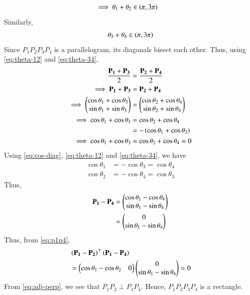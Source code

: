 \documentclass[journal,12pt,twocolumn]{IEEEtran}
\renewcommand{\vec}[1]{\boldsymbol{\mathbf{#1}}}
\begin{document}
\begin{enumerate}
\begin{align}
        \implies \theta_1+\theta_2 &\in \left(\pi,3\pi\right)
        \label{eq:theta-12}
    \end{align}
    Similarly,
    \begin{align}
        \theta_3+\theta_4 \in \left(\pi,3\pi\right)
        \label{eq:theta-34}
    \end{align}
    Since $P_1P_2P_3P_4$ is a parallelogram, its diagonals bisect each other. 
    Thus, using \eqref{eq:theta-12} and \eqref{eq:theta-34},
    \begin{align}
        \frac{\vec{P_1}+\vec{P_3}}{2} &= \frac{\vec{P_2}+\vec{P_4}}{2} \\
        \implies \vec{P_1}+\vec{P_3} &= \vec{P_2}+\vec{P_4} \\
        \implies \myvec{\cos\theta_1+\cos\theta_3\\\sin\theta_1+\sin\theta_3} &= \myvec{\cos\theta_2+\cos\theta_4\\\sin\theta_2+\sin\theta_4} \\
        \implies \cos\theta_1+\cos\theta_3 &= \cos\theta_2+\cos\theta_4 \\
                                           &= -\brak{\cos\theta_1+\cos\theta_3} \\
        \implies \cos\theta_1+\cos\theta_3 &= \cos\theta_2+\cos\theta_4 = 0
        \label{eq:cos-diag}
    \end{align}
    Using \eqref{eq:cos-diag}, \eqref{eq:theta-12} and \eqref{eq:theta-34}, we have
    \begin{align}
        \cos\theta_1 &= -\cos\theta_3 = \cos\theta_4 \\
        \cos\theta_2 &= -\cos\theta_4 = \cos\theta_3
        \label{eq:theta-14-23}
    \end{align}
    Thus,
    \begin{align}
        \vec{P_1} - \vec{P_4} &= \myvec{\cos\theta_1-\cos\theta_4\\\sin\theta_1-\sin\theta_4} \\
                              &= \myvec{0\\\sin\theta_1-\sin\theta_4}
                              \label{eq:p1p4}
    \end{align}
    Thus, from \eqref{eq:p1p4},
    \begin{align}
        &\brak{\vec{P_1}-\vec{P_2}}^\top\brak{\vec{P_1}-\vec{P_4}} \nonumber \\
        &= \myvec{\cos\theta_1-\cos\theta_2&0}\myvec{0\\\sin\theta_1-\sin\theta_4} = 0
        \label{eq:adj-perp}
    \end{align}
    From \eqref{eq:adj-perp}, we see that $P_1P_2 \perp P_1P_4$. Hence, $P_1P_2P_3P_4$ is
    a rectangle.


\end{enumerate}
\end{document}
